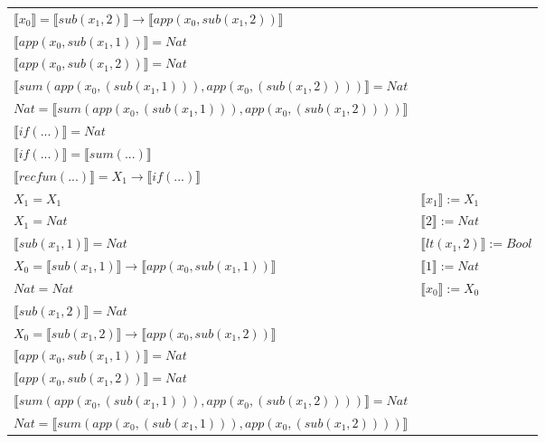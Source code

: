 \begin{exercise}
\begin{description}
\begin{center}
\begin{longtable}[!h]{ | l | l | }
                        $ \llbracket x_0 \rrbracket = \llbracket sub(x_1,2) \rrbracket \to  \llbracket app(x_0, sub(x_1,2)) \rrbracket$ & \\
                        $ \llbracket app(x_0, sub(x_1,1)) \rrbracket = Nat$ & \\
                        $ \llbracket app(x_0, sub(x_1,2)) \rrbracket = Nat$ & \\
                        $ \llbracket sum(app(x_0, (sub(x_1,1))), app(x_0, (sub(x_1,2))))  \rrbracket = Nat$ & \\
                        $Nat =  \llbracket sum(app(x_0, (sub(x_1,1))), app(x_0, (sub(x_1,2)))) \rrbracket$ & \\
                        $ \llbracket if(...) \rrbracket = Nat$ & \\
                        $ \llbracket if(...) \rrbracket =  \llbracket sum(...) \rrbracket$ & \\
                        $ \llbracket recfun(...) \rrbracket =   X_1  \to  \llbracket if(...) \rrbracket $  & \\
                    \hline
                        $X_1 = X_1$ & $ \llbracket x_1 \rrbracket := X_1$ \\
                        $X_1 = Nat$ & $ \llbracket 2 \rrbracket := Nat$ \\
                        $ \llbracket sub(x_1,1) \rrbracket = Nat$ & $ \llbracket lt(x_1 , 2) \rrbracket := Bool$  \\
                        $X_0 =  \llbracket sub(x_1,1) \rrbracket \to  \llbracket app(x_0, sub(x_1,1)) \rrbracket$ &  $ \llbracket 1 \rrbracket := Nat$\\
                        $Nat = Nat$ & $ \llbracket x_0 \rrbracket := X_0$ \\
                        $ \llbracket sub(x_1,2) \rrbracket = Nat$ & \\
                        $X_0 =  \llbracket sub(x_1,2) \rrbracket \to  \llbracket app(x_0, sub(x_1,2)) \rrbracket$ & \\
                        $ \llbracket app(x_0, sub(x_1,1)) \rrbracket = Nat$ & \\
                        $ \llbracket app(x_0, sub(x_1,2)) \rrbracket = Nat$ & \\
                        $ \llbracket sum(app(x_0, (sub(x_1,1))), app(x_0, (sub(x_1,2)))) \rrbracket = Nat$ & \\
                        $Nat =  \llbracket sum(app(x_0, (sub(x_1,1))), app(x_0, (sub(x_1,2)))) \rrbracket$ & \\

\end{longtable}
\end{center}
\end{description}
\end{exercise}
